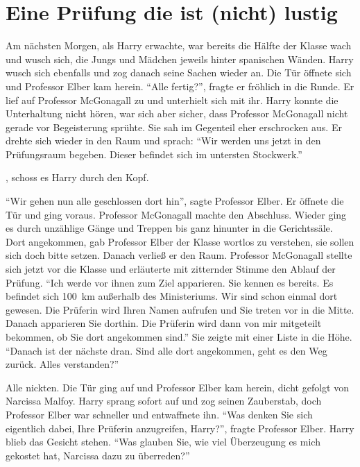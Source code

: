 \chapter{Eine Prüfung die ist (nicht) lustig}


Am nächsten Morgen, als Harry erwachte, war bereits die Hälfte der Klasse wach und wusch sich, die Jungs und Mädchen jeweils hinter spanischen Wänden. Harry wusch sich ebenfalls und zog danach seine Sachen wieder an. Die Tür öffnete sich und Professor Elber kam herein. \enquote{Alle fertig?}, fragte er fröhlich in die Runde. Er lief auf Professor McGonagall zu und unterhielt sich mit ihr. Harry konnte die Unterhaltung nicht hören, war sich aber sicher, dass Professor McGonagall nicht gerade vor Begeisterung sprühte. Sie sah im Gegenteil eher erschrocken aus. Er drehte sich wieder in den Raum und sprach: \enquote{Wir werden uns jetzt in den Prüfungsraum begeben. Dieser befindet sich im untersten Stockwerk.}

, schoss es Harry durch den Kopf.

\enquote{Wir gehen nun alle geschlossen dort hin}, sagte Professor Elber. Er öffnete die Tür und ging voraus. Professor McGonagall machte den Abschluss. Wieder ging es durch unzählige Gänge und Treppen bis ganz hinunter in die Gerichtssäle. Dort angekommen, gab Professor Elber der Klasse wortlos zu verstehen, sie sollen sich doch bitte setzen. Danach verließ er den Raum. Professor McGonagall stellte sich jetzt vor die Klasse und erläuterte mit zitternder Stimme den Ablauf der Prüfung. \enquote{Ich werde vor ihnen zum Ziel apparieren. Sie kennen es bereits. Es befindet sich 100~km außerhalb des Ministeriums. Wir sind schon einmal dort gewesen. Die Prüferin wird Ihren Namen aufrufen und Sie treten vor in die Mitte. Danach apparieren Sie dorthin. Die Prüferin wird dann von mir mitgeteilt bekommen, ob Sie dort angekommen sind.} Sie zeigte mit einer Liste in die Höhe. \enquote{Danach ist der nächste dran. Sind alle dort angekommen, geht es den Weg zurück. Alles verstanden?}

Alle nickten. Die Tür ging auf und Professor Elber kam herein, dicht gefolgt von Narcissa Malfoy. Harry sprang sofort auf und zog seinen Zauberstab, doch Professor Elber war schneller und entwaffnete ihn. \enquote{Was denken Sie sich eigentlich dabei, Ihre Prüferin anzugreifen, Harry?}, fragte Professor Elber. Harry blieb das Gesicht stehen. \enquote{Was glauben Sie, wie viel Überzeugung es mich gekostet hat, Narcissa dazu zu überreden?}

